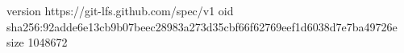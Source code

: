 version https://git-lfs.github.com/spec/v1
oid sha256:92adde6e13cb9b07beec28983a273d35cbf66f62769eef1d6038d7e7ba49726e
size 1048672
